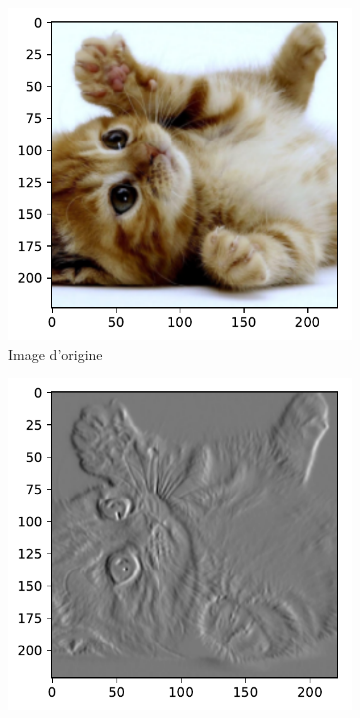 \begin{figure}[htbp]
\centering
\begin{subfigure}{0.24\textwidth}
\includegraphics[width=\linewidth]{figures/cat.pdf}
\caption{Image d'origine} \label{fig:chaton}
\end{subfigure}
\hspace*{\fill} %
\begin{subfigure}{0.24\textwidth}
\includegraphics[width=\linewidth]{figures/catConv.pdf}

\end{subfigure}
\end{figure}
